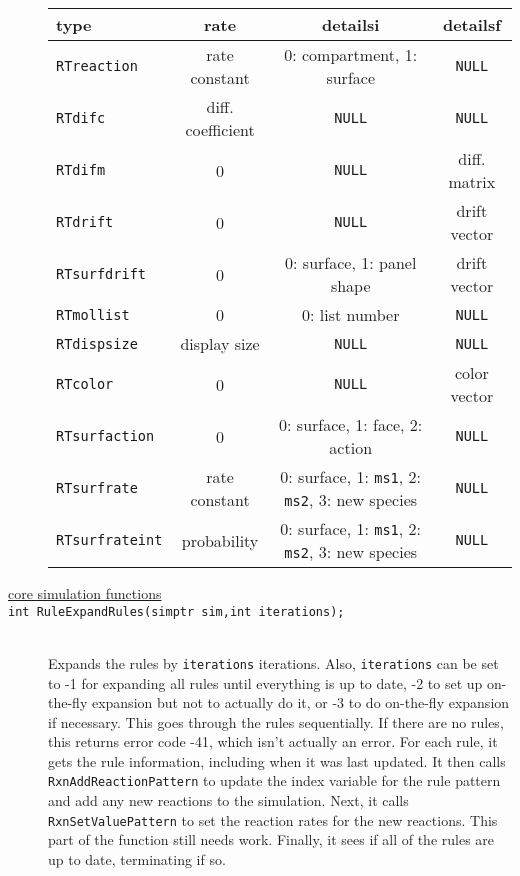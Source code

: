 \documentclass {book}
\newcommand {\ttt} {\texttt}
\begin{document}
\begin{description}
\begin{longtable}[c]{lccc}
type&rate&detailsi&detailsf\\
\hline
\ttt{RTreaction}&rate constant&0: compartment, 1: surface&\ttt{NULL}\\
\ttt{RTdifc}&diff. coefficient&\ttt{NULL}&\ttt{NULL}\\
\ttt{RTdifm}&0&\ttt{NULL}&diff. matrix\\
\ttt{RTdrift}&0&\ttt{NULL}&drift vector\\
\ttt{RTsurfdrift}&0&0: surface, 1: panel shape&drift vector\\
\ttt{RTmollist}&0&0: list number&\ttt{NULL}\\
\ttt{RTdispsize}&display size&\ttt{NULL}&\ttt{NULL}\\
\ttt{RTcolor}&0&\ttt{NULL}&color vector\\
\ttt{RTsurfaction}&0&0: surface, 1: face, 2: action&\ttt{NULL}\\
\ttt{RTsurfrate}&rate constant&0: surface, 1: \ttt{ms1}, 2: \ttt{ms2}, 3: new species&\ttt{NULL}\\
\ttt{RTsurfrateint}&probability&0: surface, 1: \ttt{ms1}, 2: \ttt{ms2}, 3: new species&\ttt{NULL}\\

\end{longtable}


\item[\underline{core simulation functions}]

\item[\ttt{int RuleExpandRules(simptr sim,int iterations);}]
\hfill \\
Expands the rules by \ttt{iterations} iterations. Also, \ttt{iterations} can be set to -1 for expanding all rules until everything is up to date, -2 to set up on-the-fly expansion but not to actually do it, or -3 to do on-the-fly expansion if necessary. This goes through the rules sequentially. If there are no rules, this returns error code -41, which isn't actually an error. For each rule, it gets the rule information, including when it was last updated. It then calls \ttt{RxnAddReactionPattern} to update the index variable for the rule pattern and add any new reactions to the simulation. Next, it calls \ttt{RxnSetValuePattern} to set the reaction rates for the new reactions. This part of the function still needs work. Finally, it sees if all of the rules are up to date, terminating if so.


\end{description}
\end{document}
